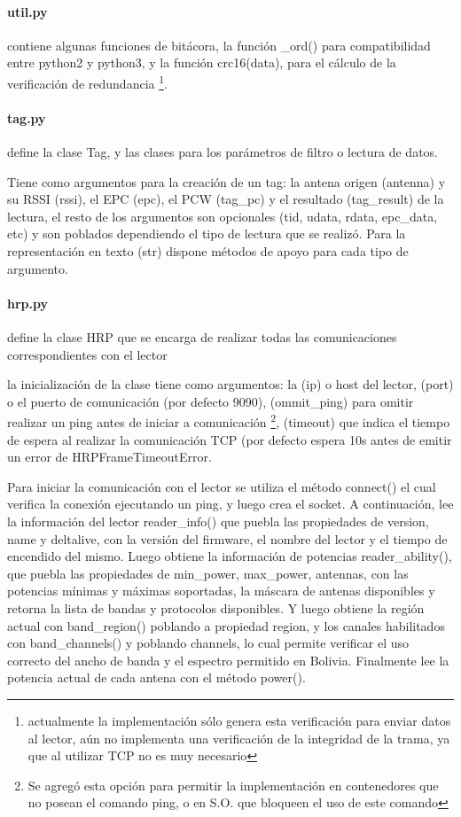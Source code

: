 \documentclass[fleqn,10pt]{SelfArx} %
\begin{document}
\paragraph {util.py} contiene algunas funciones de bitácora, la función \_ord() para compatibilidad entre python2 y python3, y la función crc16(data), para el cálculo de la verificación de redundancia \footnote{actualmente la implementación sólo genera esta verificación para enviar datos al lector, aún no implementa una verificación de la integridad de la trama, ya que al utilizar TCP no es muy necesario}.

\paragraph{tag.py} define la clase Tag, y las clases para los parámetros de filtro o lectura de datos.

Tiene como argumentos para la creación de un tag: la antena origen (antenna) y su RSSI (rssi), el EPC (epc), el PCW (tag_pc) y el resultado (tag_result) de la lectura, el resto de los argumentos son opcionales (tid, udata, rdata, epc_data, etc) y son poblados dependiendo el tipo de lectura que se realizó. Para la representación en texto (str) dispone métodos de apoyo para cada tipo de argumento.  

\paragraph{hrp.py} define la clase HRP que se encarga de realizar todas las comunicaciones correspondientes con el lector

la inicialización de la clase tiene como argumentos: la (ip) o host del lector, (port) o el puerto de comunicación (por defecto 9090), (ommit_ping) para omitir realizar un ping antes de iniciar a comunicación \footnote{Se agregó esta opción para permitir la implementación en contenedores que no posean el comando ping, o en S.O. que bloqueen el uso de este comando}, (timeout) que indica el tiempo de espera al realizar la comunicación TCP (por defecto  espera 10s antes de emitir un error de HRPFrameTimeoutError.

Para iniciar la comunicación con el lector se utiliza el método connect() el cual verifica la conexión ejecutando un ping, y luego crea el socket. A continuación, lee la información del lector reader_info() que puebla las propiedades de version, name y deltalive, con la versión del firmware, el nombre del lector y el tiempo de encendido del mismo. Luego obtiene la información de potencias reader_ability(), que puebla las propiedades de min_power, max_power, antennas, con las potencias mínimas y máximas soportadas, la máscara de antenas disponibles y retorna la lista de bandas y protocolos disponibles. Y luego obtiene la región actual con band_region() poblando a propiedad region, y los canales habilitados con band_channels() y poblando channels,  lo cual permite verificar el uso correcto del ancho de banda y el espectro permitido en Bolivia. Finalmente lee la potencia actual de cada antena con el método power().
\end{document}
